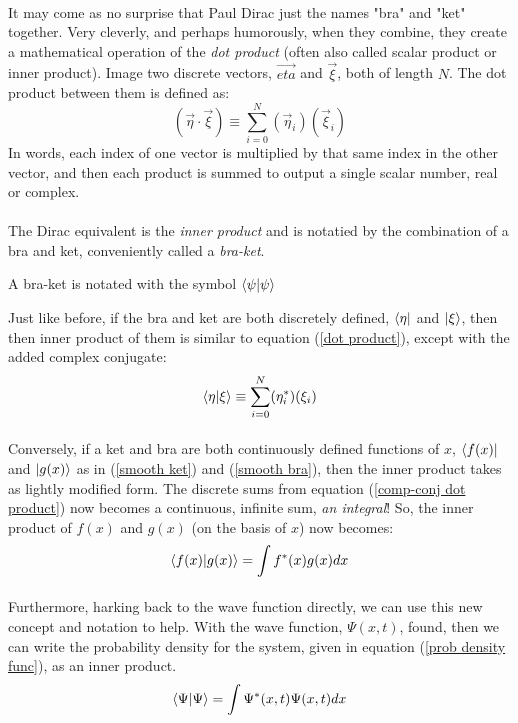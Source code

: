 \documentclass[12pt,letterpaper]{book}
\begin{document}
\paragraph*{}It may come as no surprise that Paul Dirac just the names "bra" and "ket" together. Very cleverly, and perhaps humorously, when they combine, they create a mathematical operation of the \textit{dot product} (often also called scalar product or inner product). Image two discrete vectors, 
$\vec{eta}$ and $\vec{\xi}$, both of length $N$. The dot product between them is defined as:
\begin{equation}
\label{dot product}
(\vec{\eta} \cdot \vec{\xi}) \equiv \sum_{i=0}^N (\vec{\eta}_i)(\vec{\xi}_i)
\end{equation}
In words, each index of one vector is multiplied by that same index in the other vector, and then each product is summed to output a single scalar number, real or complex.
\paragraph*{}The Dirac equivalent is the \textit{inner product} and is notatied by the combination of a bra and ket, conveniently called a \textit{bra-ket}.
\begin{center}
A bra-ket is notated with the symbol $\braket{\psi}{\psi}$
\end{center}
Just like before, if the bra and ket are both discretely defined, $\bra{\eta}$ and $\ket{\xi}$, then then inner product of them is similar to equation (\ref{dot product}), except with the added complex conjugate:
\begin{equation}
\label{comp-conj dot product}
\braket{\eta}{\xi} \equiv \sum_{i=0}^N (\eta^*_i) (\xi_i)
\end{equation}
\paragraph*{}Conversely, if a ket and bra are both continuously defined functions of $x$, $\bra{f(x)}$ and $\ket{g(x)}$ as in (\ref{smooth ket}) and (\ref{smooth bra}), then the inner product takes as lightly modified form. The discrete sums from equation (\ref{comp-conj dot product}) now becomes a continuous, infinite sum, \textit{an integral}! So, the inner product of $f(x)$ and $g(x)$ (on the basis of $x$) now becomes:
\begin{equation}
\label{bra-ket}
\braket{f(x)}{g(x)} = \int f^*(x) g(x) dx
\end{equation}
\paragraph*{}Furthermore, harking back to the wave function directly, we can use this new concept and notation to help. With the wave function, $\Psi(x,t)$, found, then we can write the probability density for the system, given in equation (\ref{prob density func}), as an inner product.
\begin{equation}
\label{inner prod integral}
\braket{\Psi}{\Psi} = \int \Psi^*(x,t) \Psi(x,t) dx
\end{equation}
\end{document}
